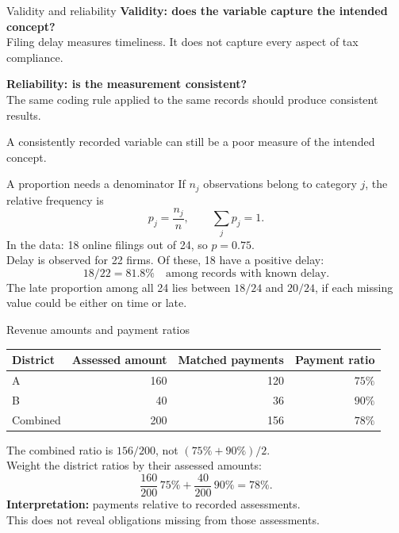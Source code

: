 \begin{frame}{Validity and reliability}
\textbf{Validity: does the variable capture the intended concept?}\\
Filing delay measures timeliness. It does not capture every aspect of tax compliance.
\par\vspace{4mm}
\textbf{Reliability: is the measurement consistent?}\\
The same coding rule applied to the same records should produce consistent results.
\par\vspace{4mm}
A consistently recorded variable can still be a poor measure of the intended concept.
\end{frame}

\begin{frame}{A proportion needs a denominator}
If $n_j$ observations belong to category $j$, the relative frequency is
\[p_j=\frac{n_j}{n},\qquad \sum_j p_j=1.\]
In the data: 18 online filings out of 24, so $p=0.75$.\\
Delay is observed for 22 firms. Of these, 18 have a positive delay:
\[18/22=81.8\% \quad\text{among records with known delay}.\]
The late proportion among all 24 lies between $18/24$ and $20/24$, if each missing value could be either on time or late.
\end{frame}

\begin{frame}{Revenue amounts and payment ratios}
\small
\begin{tabular}{lrrr}\toprule
District & Assessed amount & Matched payments & Payment ratio\\\midrule
A & 160 & 120 & $75\%$\\
B & 40 & 36 & $90\%$\\\midrule
Combined & 200 & 156 & $78\%$\\\bottomrule
\end{tabular}\par\vspace{3mm}
The combined ratio is $156/200$, not $(75\%+90\%)/2$.\\
Weight the district ratios by their assessed amounts:
\[\frac{160}{200}\,75\%+\frac{40}{200}\,90\%=78\%.\]
\textbf{Interpretation:} payments relative to recorded assessments.\\
This does not reveal obligations missing from those assessments.
\end{frame}

